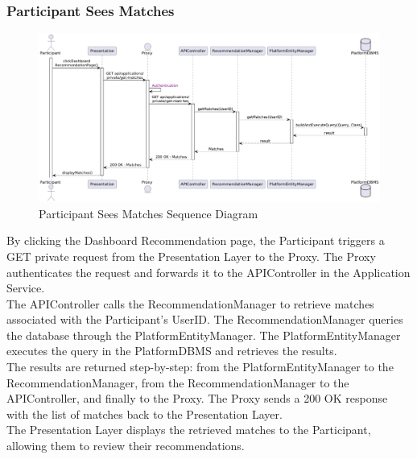 \subsubsection*{Participant Sees Matches}
\begin{figure}[H]
    \centering
    \includegraphics[width=\linewidth]{Latex/Images/DD/SequenceDiagrams/14ParticipantSeesMatches.png}
    \caption{Participant Sees Matches Sequence Diagram}
    \label{fig:partseesmatches}
\end{figure}
By clicking the Dashboard Recommendation page, the Participant triggers a GET private request from the Presentation Layer to the Proxy. The Proxy authenticates the request and forwards it to the APIController in the Application Service.\\
The APIController calls the RecommendationManager to retrieve matches associated with the Participant's UserID. The RecommendationManager queries the database through the PlatformEntityManager. The PlatformEntityManager executes the query in the PlatformDBMS and retrieves the results.\\
The results are returned step-by-step: from the PlatformEntityManager to the RecommendationManager, from the RecommendationManager to the APIController, and finally to the Proxy. The Proxy sends a 200 OK response with the list of matches back to the Presentation Layer.\\
The Presentation Layer displays the retrieved matches to the Participant, allowing them to review their recommendations.

